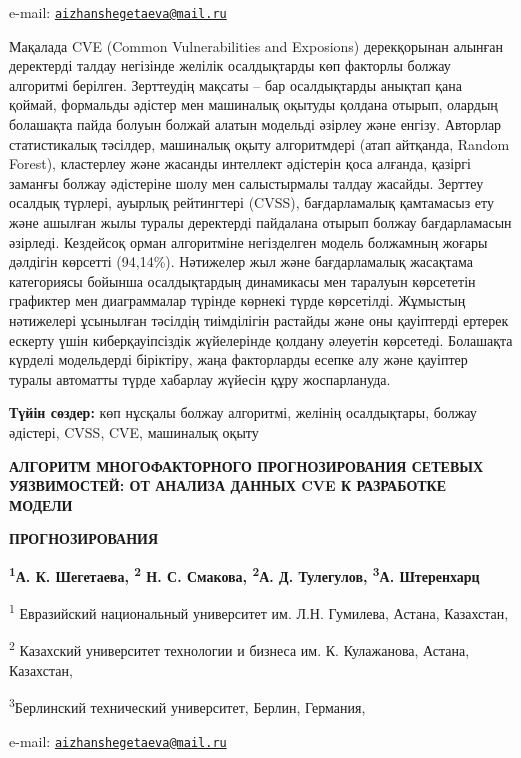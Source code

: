 e-mail:
\href{mailto:aizhanshegetaeva@mail.ru}{\nolinkurl{aizhanshegetaeva@mail.ru}}

Мақалада CVE (Common Vulnerabilities and Exposions) дерекқорынан алынған
деректерді талдау негізінде желілік осалдықтарды көп факторлы болжау
алгоритмі берілген. Зерттеудің мақсаты -- бар осалдықтарды анықтап қана
қоймай, формальды әдістер мен машиналық оқытуды қолдана отырып, олардың
болашақта пайда болуын болжай алатын модельді әзірлеу және енгізу.
Авторлар статистикалық тәсілдер, машиналық оқыту алгоритмдері (атап
айтқанда, Random Forest), кластерлеу және жасанды интеллект әдістерін
қоса алғанда, қазіргі заманғы болжау әдістеріне шолу мен салыстырмалы
талдау жасайды. Зерттеу осалдық түрлері, ауырлық рейтингтері (CVSS),
бағдарламалық қамтамасыз ету және ашылған жылы туралы деректерді
пайдалана отырып болжау бағдарламасын әзірледі. Кездейсоқ орман
алгоритміне негізделген модель болжамның жоғары дәлдігін көрсетті
(94,14\%). Нәтижелер жыл және бағдарламалық жасақтама категориясы
бойынша осалдықтардың динамикасы мен таралуын көрсететін графиктер мен
диаграммалар түрінде көрнекі түрде көрсетілді. Жұмыстың нәтижелері
ұсынылған тәсілдің тиімділігін растайды және оны қауіптерді ертерек
ескерту үшін киберқауіпсіздік жүйелерінде қолдану әлеуетін көрсетеді.
Болашақта күрделі модельдерді біріктіру, жаңа факторларды есепке алу
және қауіптер туралы автоматты түрде хабарлау жүйесін құру жоспарлануда.

{\bfseries Түйін сөздер:} көп нұсқалы болжау алгоритмі, желінің
осалдықтары, болжау әдістері, CVSS, CVE, машиналық оқыту

{\bfseries АЛГОРИТМ МНОГОФАКТОРНОГО ПРОГНОЗИРОВАНИЯ СЕТЕВЫХ УЯЗВИМОСТЕЙ: ОТ
АНАЛИЗА ДАННЫХ CVE К РАЗРАБОТКЕ МОДЕЛИ}

{\bfseries ПРОГНОЗИРОВАНИЯ}

{\bfseries \textsuperscript{1}А. К. Шегетаева\textsuperscript{\envelope },
\textsuperscript{2} Н. С. Смакова, \textsuperscript{2}А. Д. Тулегулов,
\textsuperscript{3}А. Штеренхарц}

\textsuperscript{1} Евразийский национальный университет им. Л.Н.
Гумилева, Астана, Казахстан,

\textsuperscript{2} Казахский университет технологии и бизнеса им. К.
Кулажанова, Астана, Казахстан,

\textsuperscript{3}Берлинский технический университет, Берлин, Германия,

e-mail:
\href{mailto:aizhanshegetaeva@mail.ru}{\nolinkurl{aizhanshegetaeva@mail.ru}}

